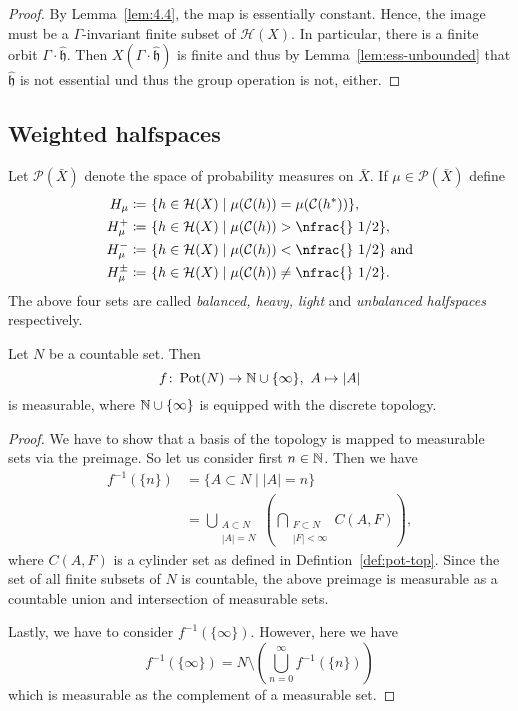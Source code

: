 \begin{proof}
  By Lemma~\ref{lem:4.4}, the map is essentially constant. Hence, the image must be a \(\Gamma\)-invariant finite subset of \(\mathcal{H}(X)\). In particular, there is a finite orbit \(\Gamma\cdot \mathfrak{\hat h}\). Then \(X(\Gamma \cdot \mathfrak{\hat h})\) is finite and thus by Lemma~\ref{lem:ess-unbounded} that \(\mathfrak{\hat h}\) is not essential und thus the group operation is not, either.
\end{proof}

\subsection{Weighted halfspaces}
\label{sec:weight}

\begin{defin}
  Let \(\mathcal{P}(\bar X)\) denote the space of probability measures on \(\bar X\). If \(\mu \in \mathcal{P}(\bar X)\) define
  \begin{align*}
    H_\mu \coloneqq &\ \{h \in \mathcal{H}(X) \mid \mu(\mathcal{C}(h)) = \mu(\mathcal{C}(h^\ast))\},\\
    H_\mu^+ \coloneqq &\ \{h \in \mathcal{H}(X) \mid \mu(\mathcal{C}(h)) > \text{\nfrac{} 1/2} \},\\
    H_\mu^- \coloneqq &\ \{h \in \mathcal{H}(X) \mid \mu(\mathcal{C}(h)) < \text{\nfrac{} 1/2}\} \text{ and}\\
    H_\mu^\pm \coloneqq &\ \{h \in \mathcal{H}(X) \mid \mu(\mathcal{C}(h)) \neq \text{\nfrac{} 1/2}\}.
  \end{align*} 
  The above four sets are called \emph{balanced, heavy, light} and \emph{unbalanced halfspaces} respectively.
\end{defin}

\begin{lemma}
  \label{lem:measurable-countable}
  Let \(N\) be a countable set. Then
  \[
    f\colon \operatorname{Pot}(N) \to \mathbb{N} \cup \{\infty\},\ A \mapsto |A|
  \]
  is measurable, where \(\mathbb{N} \cup \{\infty\}\) is equipped with the discrete topology.
\end{lemma}
\begin{proof}
  We have to show that a basis of the topology is mapped to measurable sets via the preimage. So let us consider first \(n \in \mathbb{N}\). Then we have
  \begin{align*}
    f^{-1}(\{n\})
    & = \{ A \subset N \mid |A| = n\}\\
    & = \bigcup_{\substack{A \subset N\\|A| = N}} \left ( \bigcap_{\substack{F \subset N\\|F|< \infty}}C(A,F)\right),
  \end{align*}
  where \(C(A,F)\) is a cylinder set as defined in Defintion~\ref{def:pot-top}. Since the set of all finite subsets of \(N\) is countable, the above preimage is measurable as a countable union and intersection of measurable sets.

  Lastly, we have to consider \(f^{-1}(\{\infty\})\). However, here we have
  \[
    f^{-1}(\{\infty\}) = N \setminus \left (\bigcup_{n=0}^\infty f^{-1}(\{n\})\right)
  \]
  which is measurable as the complement of a measurable set.
\end{proof}

